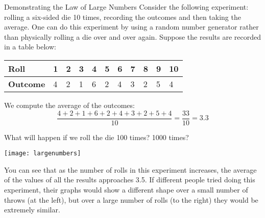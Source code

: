 \begin{example}[https://www.youtube.com/watch?v=UbKc9wadf64]{Demonstrating the Law of Large Numbers}
Consider the following experiment: rolling a six-sided die 10 times, recording the outcomes and then taking the average. One can do this experiment by using a random number generator rather than physically rolling a die over and over again. Suppose the results are recorded in a table below: \\


\begin{center}
\begin{tabular}{|l|l|l|l|l|l|l|l|l|l|l|} \hline 
\textbf{Roll} & 1 & 2 & 3 & 4 & 5 & 6 & 7 & 8 & 9 & 10 \\ \hline
\textbf{Outcome} & 4 & 2 & 1 & 6 & 2 & 4 & 3 & 2 & 5 & 4 \\ \hline
\end{tabular}
\end{center}
We compute the average of the outcomes: 
\[  \dfrac{ 4 + 2 + 1 + 6 + 2 + 4 + 3 + 2 + 5 + 4}{10} = \frac{33}{10} = 3.3 \]

What will happen if we roll the die 100 times? 1000 times? 

\begin{center}
\texttt{[image: largenumbers]}
\end{center}
You can see that as the number of rolls in this experiment increases, the average of the values of all the results approaches 3.5. If different people tried doing this experiment, their graphs would show a different shape over a small number of throws (at the left), but over a large number of rolls (to the right) they would be extremely similar.
\end{example}

